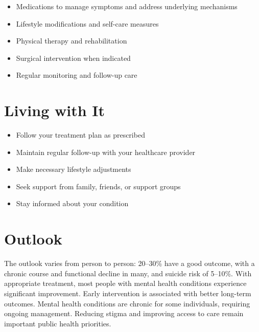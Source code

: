 \begin{itemize}[noitemsep]
  \item Medications to manage symptoms and address underlying mechanisms
  \item Lifestyle modifications and self-care measures
  \item Physical therapy and rehabilitation
  \item Surgical intervention when indicated
  \item Regular monitoring and follow-up care
\end{itemize}
\section{Living with It}
\begin{itemize}[noitemsep]
  \item Follow your treatment plan as prescribed
  \item Maintain regular follow-up with your healthcare provider
  \item Make necessary lifestyle adjustments
  \item Seek support from family, friends, or support groups
  \item Stay informed about your condition
\end{itemize}
\section{Outlook}
The outlook varies from person to person: 20--30\% have a good outcome, with a chronic course and functional decline in many, and suicide risk of 5--10\%. With appropriate treatment, most people with mental health conditions experience significant improvement. Early intervention is associated with better long-term outcomes. Mental health conditions are chronic for some individuals, requiring ongoing management. Reducing stigma and improving access to care remain important public health priorities.
